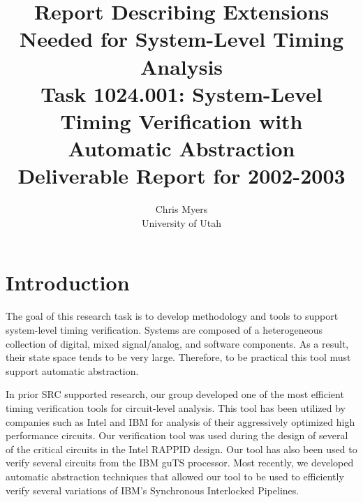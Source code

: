 \documentclass[11pt,times]{article}
\begin{document}
\title{{\bf Report Describing Extensions Needed for 
System-Level Timing Analysis \\
{\large\bf Task 1024.001: System-Level Timing Verification with 
Automatic Abstraction} \\
           {\large\bf Deliverable Report for 2002-2003}}}

\author{Chris Myers \\
University of Utah}

\normalsize

\maketitle


\section{Introduction}

The goal of this research task is to develop methodology and tools to support 
system-level timing verification.  Systems are composed of a heterogeneous 
collection of digital, mixed signal/analog, and software components.  As a 
result, their state space tends to be very large.  Therefore, to be practical 
this tool must support automatic abstraction.

In prior SRC supported research, our group developed one of the most efficient 
timing verification tools for circuit-level analysis.  This tool has been 
utilized by companies such as 
Intel and IBM for analysis of their aggressively optimized high
performance circuits.  Our verification tool was used during the design of 
several of the critical circuits in the Intel RAPPID design.  Our tool has 
also been used to verify several circuits from the IBM guTS processor. 
Most recently, we developed automatic abstraction techniques that allowed our
tool to be used to efficiently verify several variations of IBM's 
Synchronous Interlocked Pipelines.
\end{document}
